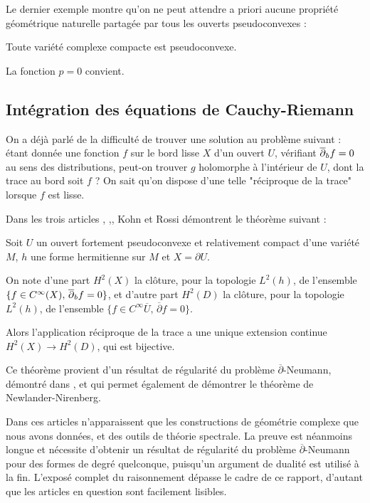 Le dernier exemple montre qu'on ne peut attendre a priori aucune propriété géométrique naturelle partagée par tous les ouverts pseudoconvexes :
\begin{exemple}
Toute variété complexe compacte est pseudoconvexe.
\end{exemple}
\begin{preuve}
La fonction $p=0$ convient.
\end{preuve}
\subsection{Intégration des équations de Cauchy-Riemann}
On a déjà parlé de la difficulté de trouver une solution au problème suivant : étant donnée une fonction $f$ sur le bord lisse $X$ d'un ouvert $U$, vérifiant $\overline{\partial}_b f =0$ au sens des distributions, peut-on trouver $g$ holomorphe à l'intérieur de $U$, dont la trace au bord soit $f$ ? On sait qu'on dispose d'une telle "réciproque de la trace" lorsque $f$ est lisse.

Dans les trois articles \cite{Kohn}, \cite{Kohn},\cite{Kohn}, Kohn et Rossi démontrent le théorème suivant :
\begin{theorem}[Kohn]
Soit $U$ un ouvert fortement pseudoconvexe et relativement compact d'une variété $M$, $h$ une forme hermitienne sur $M$ et $X=\partial U$.

On note d'une part $H^2(X)$ la clôture, pour la topologie $L^2(h)$, de l'ensemble $\{f \in C^{\infty}(X),\,\overline{\partial}_b f =0\}$, et d'autre part $H^2(D)$ la clôture, pour la topologie $L^2(h)$, de l'ensemble $\{f \in C^{\infty}{\overline{U}},\,\overline{\partial}f =0\}$.

Alors l'application réciproque de la trace a une unique extension continue $H^2(X)\to H^2(D)$, qui est bijective.
\end{theorem}
Ce théorème provient d'un résultat de régularité du problème $\overline{\partial}$-Neumann, démontré dans \cite{Kohn}, et qui permet également de démontrer le théorème de Newlander-Nirenberg.

Dans ces articles n'apparaissent que les constructions de géométrie complexe que nous avons données, et des outils de théorie spectrale. La preuve est néanmoins longue et nécessite d'obtenir un résultat de régularité du problème $\overline{\partial}$-Neumann pour des formes de degré quelconque, puisqu'un argument de dualité est utilisé à la fin. L'exposé complet du raisonnement dépasse le cadre de ce rapport, d'autant que les articles en question sont facilement lisibles.

